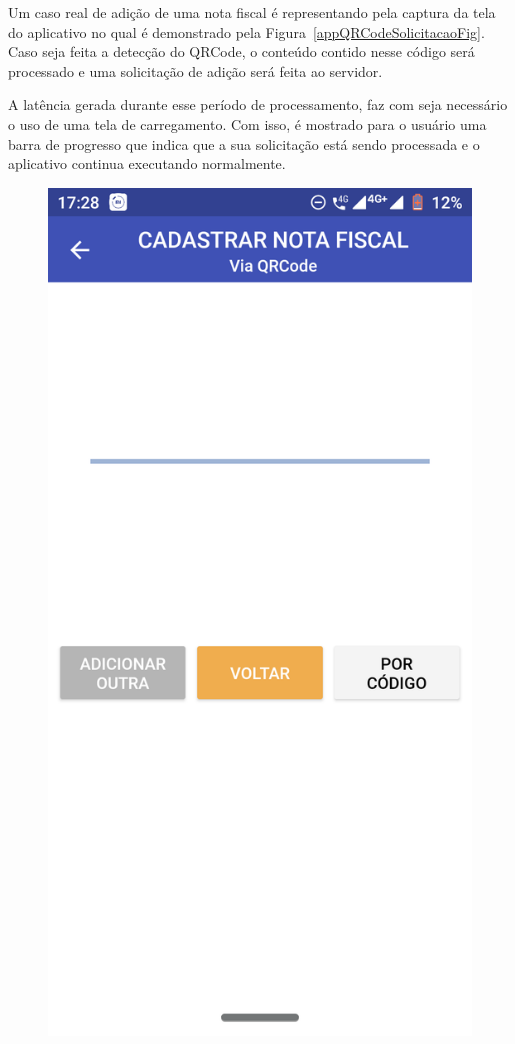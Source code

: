 Um caso real de adição de uma nota fiscal é representando pela captura da tela do aplicativo no qual é demonstrado pela Figura~\ref{appQRCodeSolicitacaoFig}. Caso seja feita a detecção do QRCode, o conteúdo contido nesse código será processado e uma solicitação de adição será feita ao servidor.

A latência gerada durante esse período de processamento, faz com seja necessário o uso de uma tela de carregamento. Com isso, é mostrado para o usuário uma barra de progresso que indica que a sua solicitação está sendo processada e o aplicativo continua executando normalmente.

\begin{figure}[h]
    \centering
    \includegraphics[scale=0.15]{tcc/figures/app/app_codigo_qrcode_loading.png}

\end{figure}
